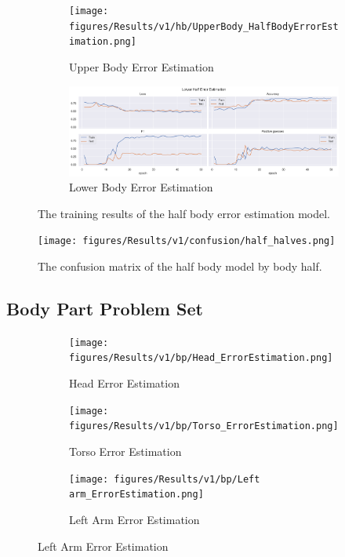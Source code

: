 \begin{figure}[ht]
  \centering
  \begin{subfigure}[b]{0.8\textwidth}
      \centering
      \texttt{[image: figures/Results/v1/hb/UpperBody\_HalfBodyErrorEstimation.png]}
      \caption{Upper Body Error Estimation}
      \label{fig:uh_ee}
  \end{subfigure}
  \hfill
  \begin{subfigure}[b]{0.8\textwidth}
      \centering
      \includegraphics[width=\textwidth]{figures/Results/v1/hb/LowerBody_ErrorEstimation_uh.png}
      \caption{Lower Body Error Estimation}
      \label{fig:lh_ee}
  \end{subfigure}
  \caption[Half Body model training results]{The training results of the half body error estimation model.}
     \label{fig:half_body_training_results}
\end{figure}

\begin{figure}[ht]
  \centering
  \texttt{[image: figures/Results/v1/confusion/half\_halves.png]}
  \caption[half Body Confusion Matrix by Body Half]{The confusion matrix of the half body model by body half.}
  \label{fig:conf_v1_hb}
\end{figure}

\subsection{Body Part Problem Set}

\begin{figure}[ht]
  \centering
  \begin{subfigure}[b]{0.9\linewidth}
      \centering
      \texttt{[image: figures/Results/v1/bp/Head\_ErrorEstimation.png]}
      \caption{Head Error Estimation}
      \label{fig:head_lb_ee}
  \end{subfigure}
  \hfill
  \begin{subfigure}[b]{0.9\linewidth}
      \centering
      \texttt{[image: figures/Results/v1/bp/Torso\_ErrorEstimation.png]}
      \caption{Torso Error Estimation}
      \label{fig:torso_lb_ee}
  \end{subfigure}
  \hfill
  \begin{subfigure}[b]{0.9\linewidth}
      \centering
      \texttt{[image: figures/Results/v1/bp/Left arm\_ErrorEstimation.png]}
      \caption{Left Arm Error Estimation}
      \label{fig:lear_lb_ee}
  \end{subfigure}
\end{figure}


